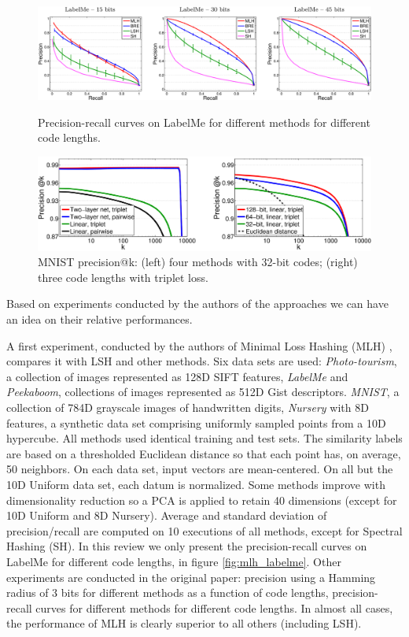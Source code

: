 \begin{figure}
	\includegraphics[width=\textwidth]{img/mlh_labelme.png}
	\caption{Precision-recall curves on LabelMe for different methods for different code lengths. \cite{norouzi2011minimal}}
	\label{fig:mlh_labelme}
	
	\includegraphics[width=\textwidth]{img/trl_vs_mlh.png}
	\caption{MNIST precision@k: (left) four methods with 32-bit codes; (right) three code lengths with triplet loss. \cite{norouzi2012hamming}}
	\label{fig:trl_vs_mlh}
\end{figure}

Based on experiments conducted by the authors of the approaches we can have an idea on their relative performances.

A first experiment, conducted by the authors of Minimal Loss Hashing (MLH) \cite{norouzi2011minimal}, compares it with LSH and other methods. Six data sets are used: \textit{Photo-tourism}, a collection of images represented as 128D SIFT features, \textit{LabelMe} and \textit{Peekaboom}, collections of images represented as 512D Gist descriptors. \textit{MNIST}, a collection of 784D grayscale images of handwritten digits, \textit{Nursery} with 8D features, a synthetic data set comprising uniformly sampled points from a 10D hypercube. All methods used identical training and test sets. The similarity labels are based on a thresholded Euclidean distance so that each point has, on average, 50 neighbors. On each data set, input vectors are mean-centered. On all but the 10D Uniform data set, each datum is normalized. Some methods improve with dimensionality reduction so a PCA is applied to retain 40 dimensions (except for 10D Uniform and 8D Nursery). Average and standard deviation of precision/recall are computed on 10 executions of all methods, except for Spectral Hashing (SH). In this review we only present the precision-recall curves on LabelMe for different code lengths, in figure \ref{fig:mlh_labelme}. Other experiments are conducted in the original paper: precision using a Hamming radius of 3 bits for different methods as a function of code lengths, precision-recall curves for different methods for different code lengths. In almost all cases, the performance of MLH is clearly superior to all others (including LSH).

